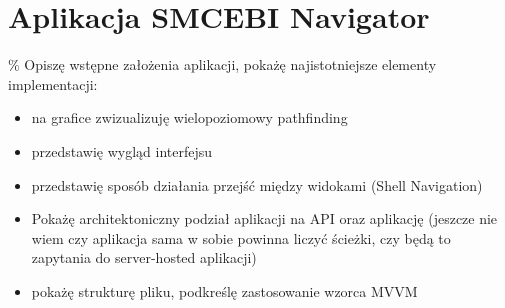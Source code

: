 \section{Aplikacja SMCEBI Navigator}

\% Opiszę wstępne założenia aplikacji, pokażę najistotniejsze elementy implementacji:
\begin{itemize}
    \item na grafice zwizualizuję wielopoziomowy pathfinding
    \item przedstawię wygląd interfejsu
    \item przedstawię sposób działania przejść między widokami (Shell Navigation)
    \item Pokażę architektoniczny podział aplikacji na API oraz aplikację
    (jeszcze nie wiem czy aplikacja sama w sobie powinna liczyć ścieżki, czy będą
    to zapytania do server-hosted aplikacji)
    \item pokażę strukturę pliku, podkreślę zastosowanie wzorca MVVM
\end{itemize}